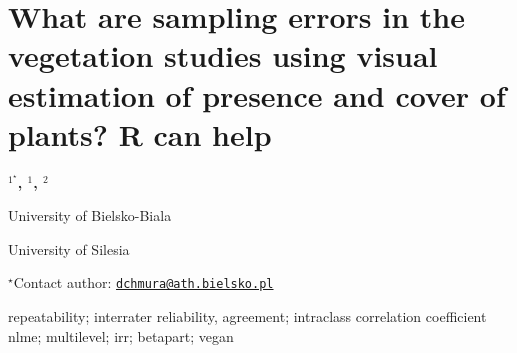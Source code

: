 \documentclass[\main/boa.tex]{subfiles}
\begin{document}
\section{What are sampling errors in the vegetation studies using visual
estimation of presence and cover of plants? R can help}

\begin{center}
  {\bf {}$^{1^\star}$, $^{1}$, $^{2}$}
\end{center}

\vskip 0.3cm

\begin{affiliations}
\begin{enumerate}
\begin{minipage}{0.915\textwidth}
\centering
\item University of Bielsko-Biala \\[-2pt]
\item University of Silesia \\[-2pt]
\end{minipage}
\end{enumerate}
$^\star$Contact author: \href{mailto:dchmura@ath.bielsko.pl}{\nolinkurl{dchmura@ath.bielsko.pl}}\\
\end{affiliations}

\vskip 0.5cm

\begin{minipage}{0.915\textwidth}
\keywords repeatability; interrater reliability, agreement; intraclass correlation
coefficient
\packages nlme; multilevel; irr; betapart; vegan
\end{minipage}

\vskip 0.8cm
\end{document}
